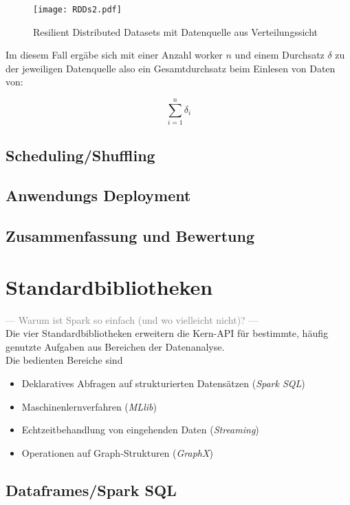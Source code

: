 \begin{figure}[h!]
	\centering
  \texttt{[image: RDDs2.pdf]}
	\caption{Resilient Distributed Datasets mit Datenquelle aus Verteilungssicht}
	\label{fig:rdds2}
\end{figure}

Im diesem Fall ergäbe sich mit einer Anzahl \gls{worker} $n$ und einem Durchsatz $\delta$ zu der jeweiligen Datenquelle also ein Gesamtdurchsatz beim Einlesen von Daten von:

\begin{equation}
	\sum_{i=1}^{n} \delta_i
\end{equation}


\subsection{Scheduling/Shuffling}

\subsection{Anwendungs Deployment}



\subsection{Zusammenfassung und Bewertung}

\section{Standardbibliotheken}
\textcolor{gray}{--- Warum ist Spark so einfach (und wo vielleicht nicht)? ---}\\
Die vier Standardbibliotheken erweitern die Kern-API für bestimmte, häufig genutzte Aufgaben aus Bereichen der Datenanalyse.\\

Die bedienten Bereiche sind
\begin{itemize}
	\item Deklaratives Abfragen auf strukturierten Datensätzen (\textit{Spark SQL})
	\item Maschinenlernverfahren (\textit{MLlib})
	\item Echtzeitbehandlung von eingehenden Daten (\textit{Streaming})
	\item Operationen auf Graph-Strukturen (\textit{GraphX})
\end{itemize}

\subsection{Dataframes/Spark SQL}
